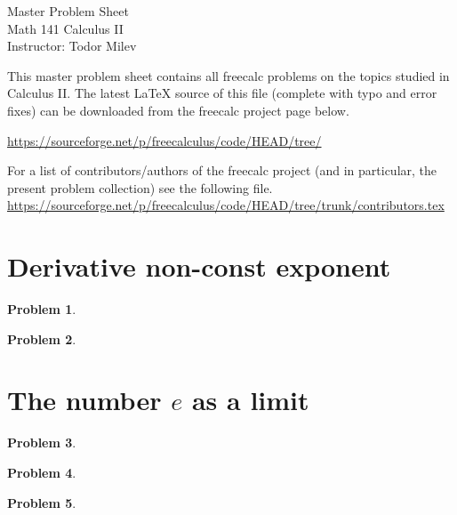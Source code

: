 \documentclass{article}
\newtheorem{problem}{Problem}
\begin{document}
\begin{center}
\Large
Master Problem Sheet \\ Math 141 Calculus II \\ \normalsize Instructor: Todor Milev
\end{center}


This master problem sheet contains all freecalc problems on the topics studied in Calculus II. The latest \LaTeX{} source of this file (complete with typo and error fixes) can be downloaded from the freecalc project page below. 

\url{https://sourceforge.net/p/freecalculus/code/HEAD/tree/}

For a list of contributors/authors of the freecalc project (and in particular, the present problem collection) see the following file.
\url{https://sourceforge.net/p/freecalculus/code/HEAD/tree/trunk/contributors.tex}

\section{Derivative non-const exponent }

\begin{problem}

\end{problem}
\begin{problem}

\end{problem}
\section{The number $e$ as a limit}
\begin{problem}

\end{problem}
\begin{problem}

\end{problem}
\begin{problem}

\end{problem}

\end{document}
